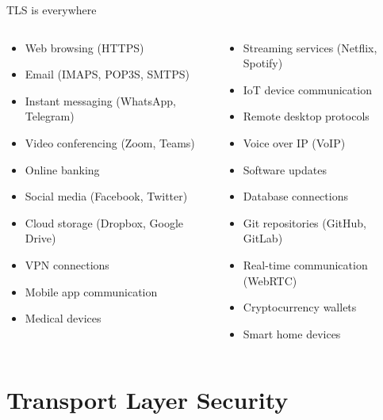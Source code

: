 \documentclass[aspectratio=169, lualatex, handout]{beamer}
\begin{document}
\begin{frame}{TLS is everywhere}
	\begin{columns}[c]
		\begin{column}{0.5\textwidth}
			\begin{itemize}
				\item Web browsing (HTTPS)
				\item Email (IMAPS, POP3S, SMTPS)
				\item Instant messaging (WhatsApp, Telegram)
				\item Video conferencing (Zoom, Teams)
				\item Online banking
				\item Social media (Facebook, Twitter)
				\item Cloud storage (Dropbox, Google Drive)
				\item VPN connections
				\item Mobile app communication
				\item Medical devices
			\end{itemize}
		\end{column}
		\begin{column}{0.5\textwidth}
			\begin{itemize}
				\item Streaming services (Netflix, Spotify)
				\item IoT device communication
				\item Remote desktop protocols
				\item Voice over IP (VoIP)
				\item Software updates
				\item Database connections
				\item Git repositories (GitHub, GitLab)
				\item Real-time communication (WebRTC)
				\item Cryptocurrency wallets
				\item Smart home devices
			\end{itemize}
		\end{column}
	\end{columns}
\end{frame}

\section{Transport Layer Security}
\end{document}
